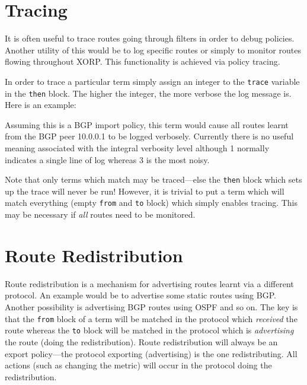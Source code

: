\section{Tracing}
It is often useful to trace routes going through filters in order to debug
policies.  Another utility of this would be to log specific routes or simply to
monitor routes flowing throughout XORP.  This functionality is achieved via policy
tracing.

In order to trace a particular term simply assign an integer to the {\tt trace}
variable in the {\tt then} block.  The higher the integer, the more verbose the
log message is.  Here is an example:

\noindent{}

Assuming this is a BGP import policy, this term would cause all routes learnt
from the BGP peer 10.0.0.1 to be logged verbosely.  Currently there is no useful
meaning associated with the integral verbosity level although 1 normally
indicates a single line of log whereas 3 is the most noisy.

Note that only terms which match may be traced---else the {\tt then} block which
sets up the trace will never be run!  However, it is trivial to put a term which
will match everything (empty {\tt from} and {\tt to} block) which simply enables
tracing.  This may be necessary if {\em all} routes need to be monitored.

\section{Route Redistribution}
Route redistribution is a mechanism for advertising routes learnt via a
different protocol.  An example would be to advertise some static routes using
BGP.  Another possibility is advertising BGP routes using OSPF and so on.  The
key is that the {\tt from} block of a term will be matched in the protocol which
{\em received} the route whereas the {\tt to} block will be matched in the
protocol which is {\em advertising} the route (doing the redistribution).
Route redistribution will always be an export policy---the protocol exporting
(advertising) is the one redistributing.  All actions (such as changing the
metric) will occur in the protocol doing the redistribution.  

